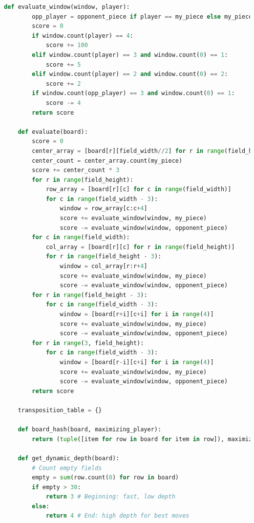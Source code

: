 \begin{lstlisting}[language=Python]
	def evaluate_window(window, player):
		opp_player = opponent_piece if player == my_piece else my_piece
		score = 0
		if window.count(player) == 4:
			score += 100
		elif window.count(player) == 3 and window.count(0) == 1:
			score += 5
		elif window.count(player) == 2 and window.count(0) == 2:
			score += 2
		if window.count(opp_player) == 3 and window.count(0) == 1:
			score -= 4
		return score
	
	def evaluate(board):
		score = 0
		center_array = [board[r][field_width//2] for r in range(field_height)]
		center_count = center_array.count(my_piece)
		score += center_count * 3
		for r in range(field_height):
			row_array = [board[r][c] for c in range(field_width)]
			for c in range(field_width - 3):
				window = row_array[c:c+4]
				score += evaluate_window(window, my_piece)
				score -= evaluate_window(window, opponent_piece)
		for c in range(field_width):
			col_array = [board[r][c] for r in range(field_height)]
			for r in range(field_height - 3):
				window = col_array[r:r+4]
				score += evaluate_window(window, my_piece)
				score -= evaluate_window(window, opponent_piece)
		for r in range(field_height - 3):
			for c in range(field_width - 3):
				window = [board[r+i][c+i] for i in range(4)]
				score += evaluate_window(window, my_piece)
				score -= evaluate_window(window, opponent_piece)
		for r in range(3, field_height):
			for c in range(field_width - 3):
				window = [board[r-i][c+i] for i in range(4)]
				score += evaluate_window(window, my_piece)
				score -= evaluate_window(window, opponent_piece)
		return score
	
	transposition_table = {}
	
	def board_hash(board, maximizing_player):
		return (tuple([item for row in board for item in row]), maximizing_player)
	
	def get_dynamic_depth(board):
		# Count empty fields
		empty = sum(row.count(0) for row in board)
		if empty > 30:
			return 3 # Beginning: fast, low depth
		else:
			return 4 # End: high depth for best moves
	

\end{lstlisting}
